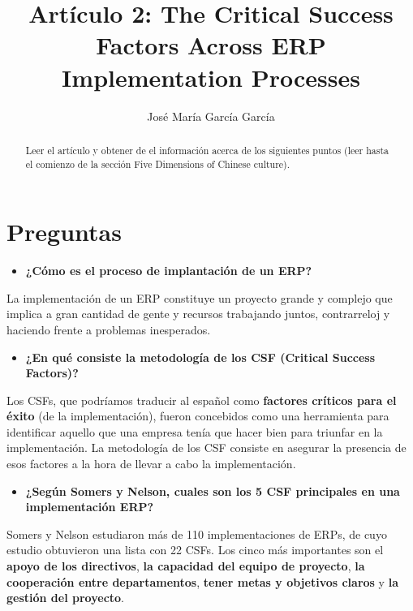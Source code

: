 \documentclass[11pt,a4paper]{article}
\author{José María García García}
\title{Artículo 2: The Critical Success Factors Across ERP Implementation Processes}
\begin{document}
\maketitle
\begin{abstract}
Leer el artículo y obtener de el información acerca de los siguientes puntos (leer hasta el comienzo de la sección Five Dimensions of Chinese culture).
\end{abstract}
%
%
\section{Preguntas}
\begin{itemize}
\item \textbf{¿Cómo es el proceso de implantación de un ERP?}
\end{itemize}
La implementación de un ERP constituye un proyecto grande y complejo que implica a gran cantidad de gente y recursos trabajando juntos, contrarreloj y haciendo frente a problemas inesperados. 

\begin{itemize}
\item \textbf{¿En qué consiste la metodología de los CSF (Critical Success Factors)?}
\end{itemize}
Los CSFs, que podríamos traducir al español como \textbf{factores críticos para el éxito} (de la implementación), fueron concebidos como una herramienta para identificar aquello que una empresa tenía que hacer bien para triunfar en la implementación. La metodología de los CSF consiste en asegurar la presencia de esos factores a la hora de llevar a cabo la implementación.

\begin{itemize}
\item \textbf{¿Según Somers y Nelson, cuales son los 5 CSF principales en una implementación ERP?}
\end{itemize}
Somers y Nelson estudiaron más de 110 implementaciones de ERPs, de cuyo estudio obtuvieron una lista con 22 CSFs. Los cinco más importantes son el \textbf{apoyo de los directivos}, \textbf{la capacidad del equipo de proyecto}, \textbf{la cooperación entre departamentos}, \textbf{tener metas y objetivos claros} y  \textbf{ la gestión del proyecto}.
\end{document}
